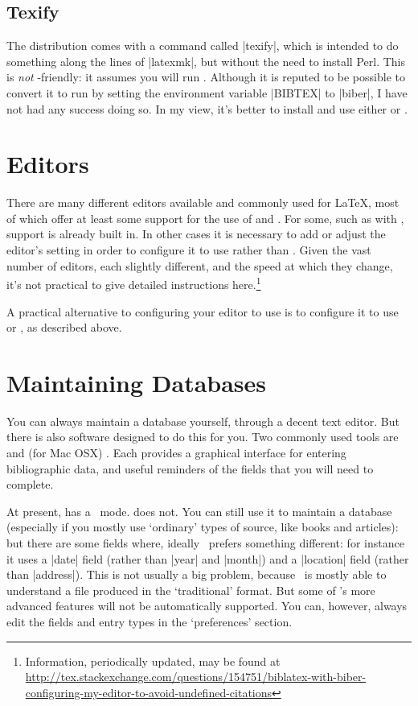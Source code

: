 \subsection{Texify}

The  distribution comes with a command called |texify|, which is intended to do something along the lines of |latexmk|, but without the need to install Perl. This is \emph{not} -friendly: it assumes you will run \bibtex. Although it is reputed to be possible to convert it to run  by setting the environment variable |BIBTEX| to |biber|, I have not had any success doing so. In my view, it's better to install and use either  or .

\section{Editors}

There are many different editors available and commonly used for \LaTeX, most of which offer at least some support for the use of  and . For some, such as  with , support is already built in. In other cases it is necessary to add or adjust the editor's setting in order to configure it to use  rather than \bibtex. Given the vast number of editors, each slightly different, and the speed at which they change, it's not practical to give detailed instructions here.\footnote{Information, periodically updated, may be found at \url{http://tex.stackexchange.com/questions/154751/biblatex-with-biber-configuring-my-editor-to-avoid-undefined-citations}}

A practical alternative to configuring your editor to use  is to configure it to use  or , as described above.

\section{Maintaining Databases}

You can always maintain a database yourself, through a decent text editor. But there is also software designed to do this for you. Two commonly used tools are  and (for Mac OSX) . Each provides a graphical interface for entering bibliographic data, and useful reminders of the fields that you will need to complete.

At present,  has a \biblatex\ mode.  does not. You can still use it to maintain a database (especially if you mostly use `ordinary' types of source, like books and articles): but there are some fields where, ideally \biblatex\ prefers something different: for instance it uses a |date| field (rather than |year| and |month|) and a |location| field (rather than |address|). This is not usually a big problem, because \biblatex\ is mostly able to understand a file produced in the `traditional' format. But some of \biblatex's more advanced features will not be automatically supported. You can, however, always edit the fields and entry types in the `preferences' section.

